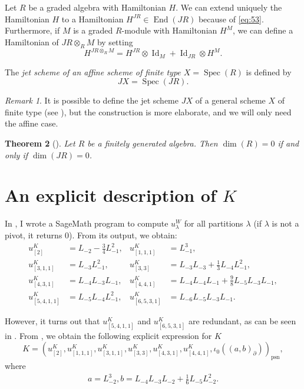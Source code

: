 \documentclass[a4paper, 12pt, reqno]{amsart}
\newtheorem{theorem}{Theorem}[section]
\theoremstyle{remark}
\newtheorem{remark}[theorem]{Remark}
\DeclareMathOperator{\Id}{Id}
\DeclareMathOperator{\End}{End}
\DeclareMathOperator{\psn}{psn}
\DeclareMathOperator{\Spec}{Spec}
\begin{document}
Let $R$ be a graded algebra with Hamiltonian $H$.
We can extend uniquely the Hamiltonian $H$ to a Hamiltonian $H^{JR} \in \End(JR)$ because of \eqref{eq:53}.
Furthermore, if $M$ is a graded $R$-module with Hamiltonian $H^M$, we can define a Hamiltonian of $JR \otimes_R M$ by setting
\begin{equation*}
  H^{JR \otimes_R M} = H^{JR}\otimes\Id_{M} + \Id_{JR}\otimes H^M.
\end{equation*}

The \emph{jet scheme of an affine scheme of finite type $X = \Spec(R)$} is defined by
\begin{equation*}
  JX = \Spec(JR).
\end{equation*}

\begin{remark}
  \label{rmk:56}
  It is possible to define the jet scheme $JX$ of a general scheme $X$ of finite type (see \cite{ein_jet_2008}), but the construction is more elaborate, and we will only need the affine case.
\end{remark}

\begin{theorem}[{\cite{ein_jet_2008}}]
  \label{thr:63}
  Let $R$ be a finitely generated algebra.
  Then $\dim(R) = 0$ if and only if $\dim(JR) = 0$.
\end{theorem}

\section{An explicit description of $K$}
\label{sec:an-expl-descr}

In \cite[ising-modules.ipynb]{sagemath2}, I wrote a SageMath program to compute $u^W_{\lambda}$ for all partitions $\lambda$ (if $\lambda$ is not a pivot, it returns $0$).
From its output, we obtain:
\begin{align*}
  u^K_{[2]} &= L_{-2} - \tfrac{3}{4}L_{-1}^2, &u^K_{[1, 1, 1]} &= L_{-1}^3, \\
  u^K_{[3, 1, 1]} &= L_{-3}L_{-1}^2, &u^K_{[3, 3]} &= L_{-3}L_{-3} + \tfrac{1}{3}L_{-4}L_{-1}^2, \\
  u^K_{[4, 3, 1]} &= L_{-4}L_{-3}L_{-1}, &u^K_{[4, 4, 1]} &= L_{-4}L_{-4}L_{-1} + \tfrac{9}{8}L_{-5}L_{-3}L_{-1}, \\
  u^K_{[5, 4, 1, 1]} &= L_{-5}L_{-4}L_{-1}^2, &u^K_{[6, 5, 3, 1]} &= L_{-6}L_{-5}L_{-3}L_{-1}.
\end{align*}

However, it turns out that $u^K_{[5, 4, 1, 1]}$ and $u^K_{[6, 5, 3, 1]}$ are redundant, as can be seen in \cite[m11-m15.ipynb]{sagemath2}.
From \cite[Theorem 2]{andrews_singular_2022}, we obtain the following explicit expression for $K$
\begin{equation*}
  K = (u^K_{[2]}, u^K_{[1, 1, 1]}, u^K_{[3, 1, 1]}, u^K_{[3, 3]}, u^K_{[4, 3, 1]}, u^K_{[4, 4, 1]}, \iota_0((a, b)_{\partial}))_{\psn},
\end{equation*}
where
\begin{align*}
  a = L_{-2}^3, b = L_{-4}L_{-3}L_{-2} + \tfrac{1}{6}L_{-5}L_{-2}^2.
\end{align*}
\end{document}
